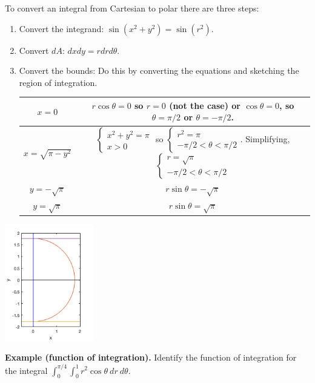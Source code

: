 \documentclass[12pt,letterpaper,noanswers]{exam}
\begin{document}
To convert an integral from Cartesian to polar there are three steps:
\begin{enumerate}
    \item Convert the integrand: $\sin(x^2+y^2) = \sin(r^2)$.
    \item Convert $dA$:  $dxdy = rdrd\theta$.
    \item Convert the bounds:  Do this by converting the equations and sketching the region of integration.
    
    \begin{tabular}{| c c |}
        \hline
    $x = 0$ & $r\cos\theta = 0$ so $r = 0$ (not the case) or $\cos\theta = 0$, so $\theta = \pi/2$ or $\theta = -\pi/2$.\\
    \hline
    $x = \sqrt{\pi-y^2}$ & $\left\{\begin{array}{c} x^2+y^2 = \pi \\ x>0 \end{array}\right.$ so $\left\{\begin{array}{c}r^2 = \pi \\ -\pi/2<\theta<\pi/2\end{array}\right.$.  Simplifying,  $\left\{\begin{array}{c}r = \sqrt{\pi} \\ -\pi/2<\theta<\pi/2\end{array}\right.$\\
        \hline
    $y = -\sqrt{\pi}$ & $r\sin\theta = -\sqrt{\pi}$ \\
        \hline
    $y = \sqrt{\pi}$ & $r\sin\theta = \sqrt{\pi}$ \\
        \hline
    \end{tabular}
\end{enumerate}

\includegraphics[height=2in]{img/C12-2dpolar.png}


\noindent\textbf{Example (function of integration).}  Identify the function of integration for the integral $\displaystyle\int_0^{\pi/4}\int_0^1r^2\cos\theta\ dr\ d\theta.$
\end{document}
